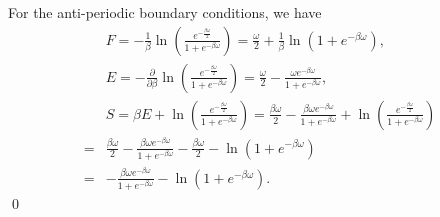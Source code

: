 For the anti-periodic boundary conditions, we have
\begin{align}
    &F = -\frac{1}{\beta} \ln \left( \frac{e^{-\frac{\beta \omega}{2}}}{1 + e^{-\beta \omega}} \right) = \frac{\omega}{2} + \frac{1}{\beta} \ln \left( 1 + e^{-\beta \omega} \right),\\
    &E = -\frac{\partial}{\partial \beta} \ln \left( \frac{e^{-\frac{\beta \omega}{2}}}{1 + e^{-\beta \omega}} \right) = \frac{\omega}{2} - \frac{\omega e^{-\beta \omega}}{1 + e^{-\beta \omega}},\\
    &S = \beta E + \ln \left( \frac{e^{-\frac{\beta \omega}{2}}}{1 + e^{-\beta \omega}} \right) = \frac{\beta \omega}{2} - \frac{\beta \omega e^{-\beta \omega}}{1 + e^{-\beta \omega}} + \ln \left( \frac{e^{-\frac{\beta \omega}{2}}}{1 + e^{-\beta \omega}} \right)\\
    =& \frac{\beta \omega}{2} - \frac{\beta \omega e^{-\beta \omega}}{1 + e^{-\beta \omega}} - \frac{\beta \omega}{2} - \ln \left( 1 + e^{-\beta \omega} \right)\\
    =& -\frac{\beta \omega e^{-\beta \omega}}{1 + e^{-\beta \omega}} - \ln \left( 1 + e^{-\beta \omega} \right).
\end{align}
\qed
